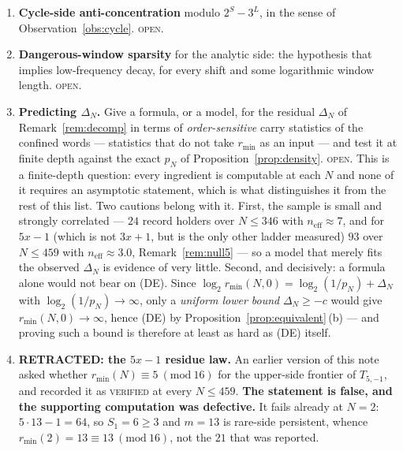 \documentclass[11pt,reqno]{amsart}
\theoremstyle{plain}
\theoremstyle{definition}
\newcommand{\lab}[1]{\textnormal{\textsc{\small #1}}}
\begin{document}
\begin{enumerate}
is recorded here as a direction, not a result.
\item \textbf{Cycle-side anti-concentration} modulo $2^{S}-3^{L}$, in the sense of
Observation~\ref{obs:cycle}. \lab{open}.
\item \textbf{Dangerous-window sparsity} for the analytic side: the hypothesis
that implies low-frequency decay, for every shift and some logarithmic window
length. \lab{open}.
\item \textbf{Predicting $\Delta_N$.} Give a formula, or a model, for the residual
$\Delta_N$ of Remark~\ref{rem:decomp} in terms of \emph{order-sensitive} carry
statistics of the confined words --- statistics that do not take $r_{\min}$ as an
input --- and test it at finite depth against the exact $p_N$ of
Proposition~\ref{prop:density}. \lab{open}. This is a finite-depth question:
every ingredient is computable at each $N$ and none of it requires an asymptotic
statement, which is what distinguishes it from the rest of this list. Two cautions
belong with it. First, the sample is small and strongly correlated --- $24$ record
holders over $N\le346$ with $n_{\mathrm{eff}}\approx7$, and for $5x-1$ (which is
not $3x+1$, but is the only other ladder measured) $93$ over $N\le459$ with
$n_{\mathrm{eff}}\approx3.0$, Remark~\ref{rem:null5} --- so a model that merely
fits the observed $\Delta_N$ is evidence of very little. Second, and decisively: a
formula alone would not bear on \textup{(DE)}. Since
$\log_2 r_{\min}(N,0)=\log_2(1/p_N)+\Delta_N$ with $\log_2(1/p_N)\to\infty$, only
a \emph{uniform lower bound} $\Delta_N\ge-c$ would give $r_{\min}(N,0)\to\infty$,
hence \textup{(DE)} by Proposition~\ref{prop:equivalent}\,(b) --- and proving such
a bound is therefore at least as hard as \textup{(DE)} itself.
\item \textbf{\textup{RETRACTED}: the $5x-1$ residue law.} An earlier version of
this note asked whether $r_{\min}(N)\equiv5\ (\mathrm{mod}\ 16)$ for the
upper-side frontier of $T_{5,-1}$, and recorded it as \lab{verified} at every
$N\le459$. \textbf{The statement is false, and the supporting computation was
defective.} It fails already at $N=2$: $5\cdot13-1=64$, so $S_1=6\ge3$ and
$m=13$ is rare-side persistent, whence $r_{\min}(2)=13\equiv13\
(\mathrm{mod}\ 16)$, not the $21$ that was reported.


\end{enumerate}
\end{document}
